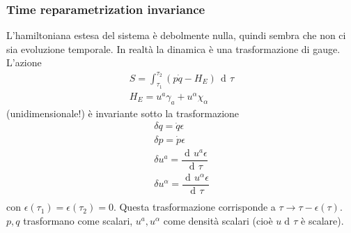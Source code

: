 \documentclass[a4paper, 11pt]{article}
\newcommand{\dd}{\mathop{\mathrm{d}\!}{}}
\newcommand{\deriv}[2]{\dfrac{\dd #1}{\dd #2}}
\begin{document}
	\subsubsection{Time reparametrization invariance}
	L'hamiltoniana estesa del sistema è debolmente nulla, quindi sembra che non ci sia evoluzione temporale. In realtà la dinamica è una trasformazione di gauge. L'azione 
	\begin{eqnarray}
	S = \int_{\tau_1}^{\tau_2} (p \dot{q} - H_E)\, \dd \tau \\
	H_E = u^a \gamma_a + u^\alpha \chi_\alpha
	\end{eqnarray}
	(unidimensionale!) è invariante sotto la trasformazione
	\begin{eqnarray}
	\delta q = \dot{q} \epsilon \\
	\delta p = \dot{p} \epsilon \\
	\delta u^a = \deriv{u^a \epsilon}{\tau} \\
	\delta u^\alpha = \deriv{u^\alpha \epsilon}{\tau} \\
	\end{eqnarray}
	con $\epsilon(\tau_1)=\epsilon(\tau_2) = 0$. Questa trasformazione corrisponde a $\tau\rightarrow \tau - \epsilon(\tau)$. $p,q$ trasformano come scalari, $u^a,u^\alpha$ come densità scalari (cioè $u\dd \tau$ è scalare).
\end{document}

